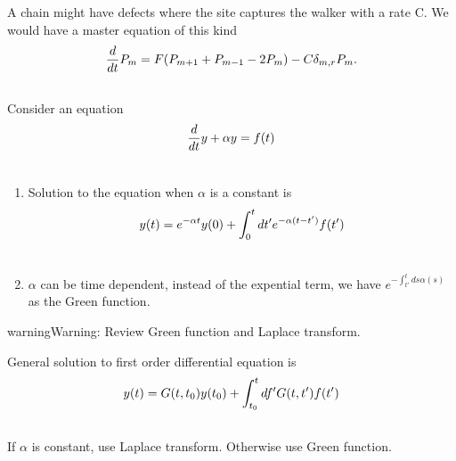 \documentclass[letterpaper,10pt,english]{sphinxmanual}
\begin{document}
A chain might have defects where the site captures the walker with a rate C. We would have a master equation of this kind
\begin{gather}
\begin{split}\frac{d}{dt}P_m = F(P_{m+1}+P_{m-1}-2P_m) - C \delta_{m,r} P_m .\end{split}\notag\\\begin{split}\end{split}\notag
\end{gather}
Consider an equation
\begin{gather}
\begin{split}\frac{d}{dt}y+\alpha y = f(t)\end{split}\notag\\\begin{split}\end{split}\notag
\end{gather}\begin{enumerate}
\item {} 
Solution to the equation when $\alpha$ is a constant is
\begin{gather}
\begin{split}y(t)  = e^{-\alpha t} y(0) + \int_0^t dt' e^{-\alpha (t - t')} f(t')\end{split}\notag\\\begin{split}\end{split}\notag
\end{gather}
\item {} 
$\alpha$ can be time dependent, instead of the expential term, we have $e^{-\int_{t'}^t ds \alpha(s)}$ as the Green function.

\end{enumerate}

\begin{notice}{warning}{Warning:}
Review Green function and Laplace transform.

General solution to first order differential equation is
\begin{gather}
\begin{split}y(t) = G(t,t_0) y(t_0) + \int_{t_0}^{t} df' G(t,t') f(t')\end{split}\notag\\\begin{split}\end{split}\notag
\end{gather}
If $\alpha$ is constant, use Laplace transform. Otherwise use Green function.
\end{notice}
\end{document}
